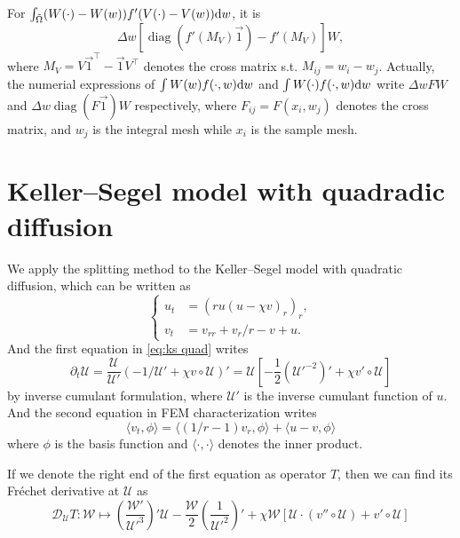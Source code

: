 \documentclass{article}
\newcommand{\frender}{\mathcal D}
\begin{document}
  For $\int_{\tilde\Omega}(W(\cdot) - W(w))f'(V(\cdot) - V(w))\mathrm d w$, it is
  \[
    \Delta w\left[\operatorname{diag}\left(f'(M_V)\vec 1\right) - f'(M_V)\right]W,
  \]
  where $M_V = V\vec 1^\top - \vec 1 V^\top$ denotes the cross matrix s.t. $M_{ij} = w_i - w_j$.
  Actually, the numerial expressions of $\int W(w)f(\cdot, w)\mathrm d w$ and $\int W(\cdot)f(\cdot, w)\mathrm d w$
  write $\Delta w FW$ and $\Delta w\operatorname{diag}(F\vec 1)W$ respectively,
  where $F_{ij} = F(x_i, w_j)$ denotes the cross matrix, and $w_j$ is the integral mesh while $x_i$ is
  the sample mesh.

  \section{Keller--Segel model with quadradic diffusion}
  We apply the splitting method to the Keller--Segel model with quadratic diffusion,
  which can be written as
  \begin{equation}
    \label{eq:ks quad}
    \left\{
      \begin{aligned}
        u_t &= (ru(u - \chi v)_r)_r, \\
        v_t &= v_{rr} + v_r / r - v + u.
      \end{aligned}
    \right.
  \end{equation}
  And the first equation in \cref{eq:ks quad} writes
  \[
    \partial_t\mathcal U = \frac{\mathcal U}{\mathcal U'}
                           (-1 / \mathcal U' + \chi v\circ\mathcal U)'
                         = \mathcal U\left[-\frac 12\left({\mathcal U'}^{-2}\right)'
                           + \chi v'\circ\mathcal U\right]
  \]
  by inverse cumulant formulation, where $\mathcal U'$ is the inverse cumulant
  function of $u$. And the second equation in FEM characterization writes
  \[
    \langle v_t, \phi\rangle
    = \langle (1 / r - 1)v_r, \phi\rangle + \langle u - v, \phi\rangle
  \]
  where $\phi$ is the basis function and $\langle\cdot, \cdot\rangle$ denotes
  the inner product.

  If we denote the right end of the first equation as operator $T$, then
  we can find its Fr\'echet derivative at $\mathcal U$ as
  \[
    \frender_{\mathcal U}T: \mathcal W\mapsto
    \left(\frac{\mathcal W'}{\mathcal U'^3}\right)'\mathcal U
    - \frac{\mathcal W}2\left(\frac1{\mathcal U'^2}\right)'
    +\chi\mathcal W\left[\mathcal U\cdot(v''\circ\mathcal U) + v'\circ\mathcal U\right]
  \]
\end{document}
